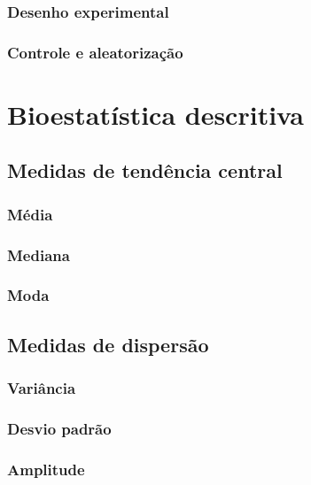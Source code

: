 \documentclass[
]{book}
\begin{document}
\subsection{Desenho experimental}\label{desenho-experimental}

\subsection{Controle e aleatorização}\label{controle-e-aleatorizauxe7uxe3o}

\chapter{Bioestatística descritiva}\label{bioestatuxedstica-descritiva}

\section{Medidas de tendência central}\label{medidas-de-tenduxeancia-central}

\subsection{Média}\label{muxe9dia}

\subsection{Mediana}\label{mediana}

\subsection{Moda}\label{moda}

\section{Medidas de dispersão}\label{medidas-de-dispersuxe3o}

\subsection{Variância}\label{variuxe2ncia}

\subsection{Desvio padrão}\label{desvio-padruxe3o}

\subsection{Amplitude}\label{amplitude}
\end{document}
